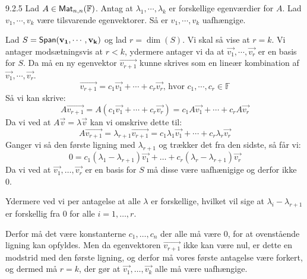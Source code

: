 \begin{lemma}{9.2.5}
	Lad $A \in \textsf{Mat}_{n,n}(\mathbb{F})$. Antag at $\lambda_1, \cdots, \lambda_k$
	er forskellige egenværdier for $A$. Lad $v_1, \cdots, v_k$ være tilsvarende
	egenvektorer. Så er $v_1, \cdots, v_k$ uafhængige.
\end{lemma}
\begin{bevis}
	Lad $S = \textsf{Span}(\mathbf{v_1}, \cdots, \mathbf{v_k})$ og lad $r = \dim(S)$. Vi skal 
	så vise at $r = k$. Vi antager modsætningsvis at $r < k$, ydermere antager 
	vi da at $\vec{v_1}, \cdots, \vec{v_r}$ er en basis for $S$. Da må en 
	ny egenvektor $\vec{v_{r+1}}$ kunne skrives som en lineær kombination af 
	$\vec{v_1}, \cdots, \vec{v_r}$.
	\[
		\vec{v_{r+1}} = c_1\vec{v_1} + \cdots + c_r\vec{v_r}\text{, hvor } 
		c_1, \cdots, c_r \in \mathbb{F}
	\]
	Så vi kan skrive:
	\[
		A\vec{v_{r+1}} = A(c_1\vec{v_1}+ \cdots + c_r\vec{v_r}) = 
		c_1A\vec{v_1} + \cdots + c_rA\vec{v_r}
	\]
	Da vi ved at $A\vec{v} = \lambda \vec{v}$ kan vi omskrive dette til:
	\[
		A\vec{v_{r+1}} = \lambda_{r+1}\vec{v_{r+1}} = c_1\lambda_1\vec{v_1} + 
		\cdots + c_r\lambda_r\vec{v_r}
	\]
	Ganger vi så den første ligning med $\lambda_{r+1}$ og trækker det fra den
	sidste, så får vi:
	\[
		0 = c_1(\lambda_1-\lambda_{r+1})\vec{v_1} + \dotso + 
		c_r(\lambda_r-\lambda_{r+1})\vec{v_r}
	\]
	Da vi ved at $\vec{v_1}, \dotsc, \vec{v_r}$ er en basis for $S$ må disse
	være uafhænigige og derfor ikke 0.
	
	Ydermere ved vi per antagelse at alle $\lambda$ er forskellige, hvilket vil
	sige at $\lambda_i-\lambda_{r+1}$ er forskellig fra 0 for alle $i = 1,
	\dotsc, r$. 
	
	Derfor må det være konstanterne $c_1, \dotsc, c_n$ der alle må være 0, for
	at ovenstående ligning kan opfyldes. Men da egenvektoren $\vec{v_{r+1}}$
	ikke kan være nul, er dette en modstrid med den første ligning, og derfor
	må vores første antagelse være forkert, og dermed må $r = k$, der gør at
	$\vec{v_1}, \dotsc, \vec{v_k}$ alle må være uafhængige.
\end{bevis}
